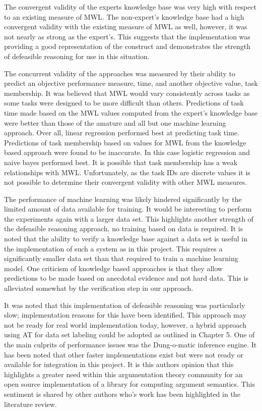 The convergent validity of the experts knowledge base was very high with respect to an existing measure of MWL. The non-expert's knowledge base had a high convergent validity with the existing measure of MWL as well, however, it was not nearly as strong as the expert's. This suggests that the implementation was providing a good representation of the construct and demonstrates the strength of defeasible reasoning for use in this situation.

The concurrent validity of the approaches was measured by their ability to predict an objective performance measure, time, and another objective value, task membership. It was believed that MWL would vary consistently across tasks as some tasks were designed to be more difficult than others. Predictions of task time made based on the MWL values computed from the expert's knowledge base were better than those of the amature and all but one machine learning approach. Over all, linear regression performed best at predicting task time. Predictions of task membership based on values for MWL from the knowledge based approach were found to be inaccurate. In this case logistic regression and naive bayes performed best. It is possible that task membership has a weak relationships with MWL. Unfortunately, as the task IDs are discrete values it is not possible to determine their convergent validity with other MWL measures. 

The performance of machine learning was likely hindered significantly by the limited amount of data available for training. It would be interesting to perform the experiments again with a larger data set. This highlights another strength of the defeasible reasoning approach, no training based on data is required. It is noted that the ability to verify a knowledge base against a data set is useful in the implementation of such a system as in this project. This requires a significantly smaller data set than that required to train a machine learning model. One criticism of knowledge based approaches is that they allow predictions to be made based on anecdotal evidence and not hard data. This is alleviated somewhat by the verification step in our approach. 

It was noted that this implementation of defeasible reasoning was particularly slow; implementation reasons for this have been identified. This approach may not be ready for real world implementation today, however, a hybrid approach using AT for data set labeling could be adopted as outlined in Chapter 5. One of the main culprits of performance issues was the Dung-o-matic inference engine. It has been noted that other faster implementations exist but were not ready or available for integration in this project. It is this authors opinion that this highlights a greater need within this argumentation theory community for an open source implementation of a library for computing argument semantics. This sentiment is shared by other authors who's work has been highlighted in the literature review.

